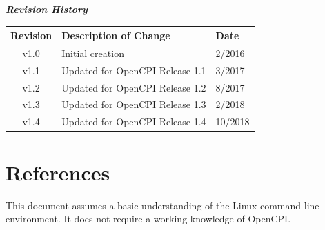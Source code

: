         \begin{center}
        \textit{\textbf{Revision History}}
                \begin{table}[H]
                \label{table:revisions} %
                        \begin{tabularx}{\textwidth}{|c|X|l|}
                        \hline
                        \rowcolor{blue}
                        \textbf{Revision} & \textbf{Description of Change} & \textbf{Date} \\
                        \hline
                        v1.0 & Initial creation & 2/2016 \\
                        \hline
                        v1.1 & Updated for OpenCPI Release 1.1 & 3/2017 \\
			            \hline
                        v1.2 & Updated for OpenCPI Release 1.2 & 8/2017 \\
                        \hline
                        v1.3 & Updated for OpenCPI Release 1.3 & 2/2018 \\
                        \hline
                        v1.4 & Updated for OpenCPI Release 1.4 & 10/2018 \\
                        \hline
                        \end{tabularx}
                \end{table}
        \end{center}

\newpage

\tableofcontents

\newpage

\listoffigures

\newpage

\listoftables

\newpage

\section{References}

This document assumes a basic understanding of the Linux command line environment. It does not require a working knowledge of OpenCPI.
\def\refskipgs{} %
\def\myreferences{
\hline
Component Development Guide & OpenCPI & \url{http://opencpi.github.io/OpenCPI_Component_Development.pdf} \\
\hline
RCC Development Guide & OpenCPI & \url{http://opencpi.github.io/OpenCPI_RCC_Development.pdf} \\
\hline
HDL Development Guide & OpenCPI & \url{http://opencpi.github.io/OpenCPI_HDL_Development.pdf} \\
}


